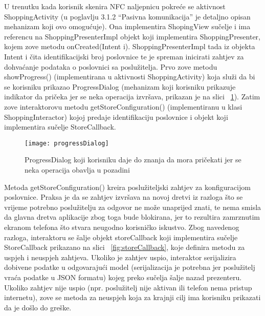 U trenutku kada korisnik skenira NFC naljepnicu pokre\'{c}e se aktivnost ShoppingActivity (u poglavlju 3.1.2 ``Pasivna komunikacija'' je detaljno opisan mehanizam koji ovo omogu\'{c}uje). Ona implementira ShopingView su\v{c}elje i ima referencu na ShoppingPresenterImpl objekt koji implementira ShoppingPresenter, kojem zove metodu onCreated(Intent i). ShoppingPresenterImpl tada iz objekta Intent i \v{c}ita identifikacijski broj poslovnice te je spreman inicirati zahtjev za dohva\'{c}anje podataka o poslovnici sa poslu\v{z}itelja. Prvo zove metodu showProgress() (implementirana u aktivnosti ShoppingActivity) koja slu\v{z}i da bi se korisniku prikazao ProgressDialog (mehanizam koji korisniku prikazuje indikator da pri\v{c}eka jer se neka operacija izvr\v{s}ava, prikazan je na slici ~\ref{fig:progressDialog}). Zatim zove interaktorovu metodu getStoreConfiguration() (implementiranu u klasi ShoppingInteractor) kojoj predaje identifikaciju poslovnice i objekt koji implementira su\v{c}elje StoreCallback.


\begin{figure}[!htbp]
	\begin{center}
 \texttt{[image: progressDialog]}
 \caption{ProgressDialog koji korisniku daje do znanja da mora pri\v{c}ekati jer se neka operacija obavlja u pozadini}
 \label{fig:progressDialog}
	\end{center}
\end{figure}

Metoda getStoreConfiguration() kreira poslu\v{z}iteljski zahtjev za konfiguracijom poslovnice. Praksa je da se zahtjev izvr\v{s}ava na novoj dretvi iz razloga \v{s}to se vrijeme potrebno poslu\v{z}itelju za odgovor ne mo\v{z}e unaprijed znati, te nema smisla da glavna dretva aplikacije zbog toga bude blokirana, jer to rezultira zamrznutim ekranom telefona \v{s}to stvara neugodno korisni\v{c}ko iskustvo. Zbog navedenog razloga, interaktoru se \v{s}alje objekt storeCallback koji implementira su\v{c}elje StoreCallback prikazano na slici ~\ref{fig:storeCallback}, koje definira metodu za uspjeh i neuspjeh zahtjeva. Ukoliko je zahtjev uspio, interaktor serijalizira dobivene podatke u odgovaraju\'{c}i model (serijalizacija je potrebna jer poslu\v{z}itelj vra\'{c}a podatke u JSON formatu) kojeg preko su\v{c}elja \v{s}alje nazad prezenteru. Ukoliko zahtjev nije uspio (npr. poslu\v{z}itelj nije aktivan ili telefon nema pristup internetu), zove se metoda za neuspjeh koja za krajnji cilj ima korisniku prikazati da je do\v{s}lo do gre\v{s}ke.


